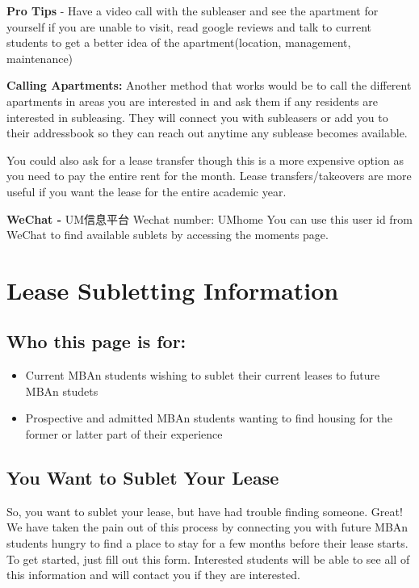 \documentclass[
]{book}
\providecommand{\tightlist}{%
  \setlength{\itemsep}{0pt}\setlength{\parskip}{0pt}}
\begin{document}
\textbf{Pro Tips} - Have a video call with the subleaser and see the apartment for yourself if you are unable to visit, read google reviews and talk to current students to get a better idea of the apartment(location, management, maintenance)

\textbf{Calling Apartments: }
Another method that works would be to call the different apartments in areas you are interested in and ask them if any residents are interested in subleasing. They will connect you with subleasers or add you to their addressbook so they can reach out anytime any sublease becomes available.

You could also ask for a lease transfer though this is a more expensive option as you need to pay the entire rent for the month. Lease transfers/takeovers are more useful if you want the lease for the entire academic year.

\textbf{WeChat - }
UM信息平台
Wechat number: UMhome
You can use this user id from WeChat to find available sublets by accessing the moments page.

\hypertarget{lease-subletting-information}{%
\section{Lease Subletting Information}\label{lease-subletting-information}}

\hypertarget{who-this-page-is-for}{%
\subsection{Who this page is for:}\label{who-this-page-is-for}}

\begin{itemize}
\tightlist
\item
  Current MBAn students wishing to sublet their current leases to future MBAn studets
\item
  Prospective and admitted MBAn students wanting to find housing for the former or latter part of their experience
\end{itemize}

\hypertarget{you-want-to-sublet-your-lease}{%
\subsection{You Want to Sublet Your Lease}\label{you-want-to-sublet-your-lease}}

So, you want to sublet your lease, but have had trouble finding someone. Great! We have taken the pain out of this process by connecting you with future MBAn students hungry to find a place to stay for a few months before their lease starts. To get started, just fill out this form. Interested students will be able to see all of this information and will contact you if they are interested.
\end{document}
